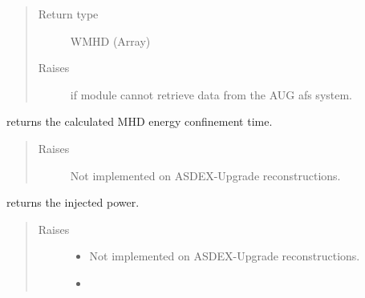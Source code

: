\documentclass[letterpaper,10pt,english]{sphinxmanual}
\begin{document}
\begin{fulllineitems}
\begin{fulllineitems}
\begin{quote}
\begin{description}
\item[{Return type}] \leavevmode
WMHD (Array)

\item[{Raises}] \leavevmode
{} \textendash{} if module cannot retrieve data from the AUG afs system.

\end{description}\end{quote}

\end{fulllineitems}


\begin{fulllineitems}
\label{\detokenize{eqtools:eqtools.AUGData.AUGDDData.getTauMHD}}
returns the calculated MHD energy confinement time.
\begin{quote}\begin{description}
\item[{Raises}] \leavevmode
{} \textendash{} Not implemented on ASDEX-Upgrade reconstructions.

\end{description}\end{quote}

\end{fulllineitems}


\begin{fulllineitems}
\label{\detokenize{eqtools:eqtools.AUGData.AUGDDData.getPinj}}
returns the injected power.
\begin{quote}\begin{description}
\item[{Raises}] \leavevmode\begin{itemize}
\item {} 
 \textendash{} Not implemented on ASDEX-Upgrade reconstructions.

\item {} 
\sphinxstyleliteralstrong{\sphinxupquote{}} \textendash{} 


\end{itemize}
\end{description}
\end{quote}
\end{fulllineitems}
\end{fulllineitems}
\end{document}
